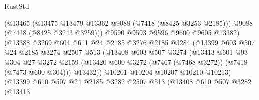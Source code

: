 \begin{lexlean}{RustStd}
\begin{coremodule}
                                (@13465
                                  (@13475 @13479 @13362 @9088 (@7418 (@8425 @3253 @2185)))
                                  @9088
                                  (@7418 (@8425 @3243 @3259)))
                                @9590
                                @9593
                                @9596
                                @9600
                                @9605
                                @13382)
                              (@13388
                                @3269
                                @604
                                @611
                                @24
                                @2185
                                @3276
                                @2185
                                @3284
                                (@13399
                                  @603
                                  @507
                                  @24
                                  @2185
                                  @3274
                                  @2507
                                  @513
                                  (@13408
                                    @603
                                    @507
                                    @3274
                                    (@13413
                                      @601
                                      @93
                                      @304
                                      @27
                                      @3272
                                      @2159
                                      (@13420
                                        @600
                                        @3272
                                        (@7467 (@7468 @3272))
                                        (@7418 (@7473 @600 @304)))
                                      @13432))
                                  @10201
                                  @10204
                                  @10207
                                  @10210
                                  @10213)
                                (@13399
                                  @610
                                  @507
                                  @24
                                  @2185
                                  @3282
                                  @2507
                                  @513
                                  (@13408
                                    @610
                                    @507
                                    @3282
                                    (@13413

\end{coremodule}
\end{lexlean}
